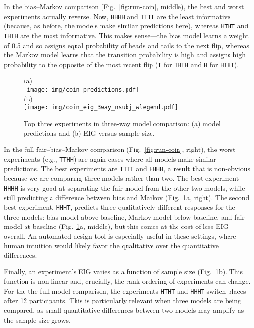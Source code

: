 \documentclass[10pt,letterpaper]{article}
\begin{document}
In the bias--Markov comparison (Fig.~\ref{fig:run-coin}, middle), the best and worst experiments actually reverse.
Now, \lstinline{HHHH} and \lstinline{TTTT} are the least informative (because, as before, the models make similar predictions here), whereas \lstinline{HTHT} and \lstinline{THTH} are the most informative.
This makes sense---the bias model learns a weight of 0.5 and so assigns equal probability of heads and tails to the next flip, whereas the Markov model learns that the transition probability is high and assigns high probability to the opposite of the most recent flip (\lstinline{T} for \lstinline{THTH} and \lstinline{H} for \lstinline{HTHT}).

\begin{figure}[t]
            (a) \\ \texttt{[image: img/coin\_predictions.pdf]}\\ (b) \\ \texttt{[image: img/coin\_eig\_3way\_nsubj\_wlegend.pdf]}
  \caption{Top three experiments in three-way model comparison: (a) model predictions and (b) EIG versus sample size.}
  \label{fig:coin_preds}
\end{figure}

In the full fair--bias--Markov comparison (Fig.~\ref{fig:run-coin}, right), the worst experiments (e.g., \lstinline{TTHH}) are again cases where all models make similar predictions.
The best experiments are \lstinline{TTTT} and \lstinline{HHHH}, a result that is non-obvious because we are comparing three models rather than two.
The best experiment \lstinline{HHHH} is very good at separating the fair model from the other two models, while still predicting a difference between bias and Markov (Fig.~\ref{fig:coin_preds}a, right).
The second best experiment, \lstinline{HHHT}, predicts three qualitatively different responses for the three models: bias model above baseline, Markov model below baseline, and fair model at baseline (Fig.~\ref{fig:coin_preds}a, middle), but this comes at the cost of less EIG overall.
An automated design tool is especially useful in these settings, where human intuition would likely favor the qualitative over the quantitative differences.

Finally, an experiment's EIG varies as a function of sample size (Fig.~\ref{fig:coin_preds}b).
This function is non-linear and, crucially, the rank ordering of experiments can change.
For the the full model comparison, the experiments \lstinline{HTHT} and \lstinline{HHHT} switch places after 12 participants.
This is particularly relevant when three models are being compared, as small quantitative differences between two models may amplify as the sample size grows.
\end{document}
